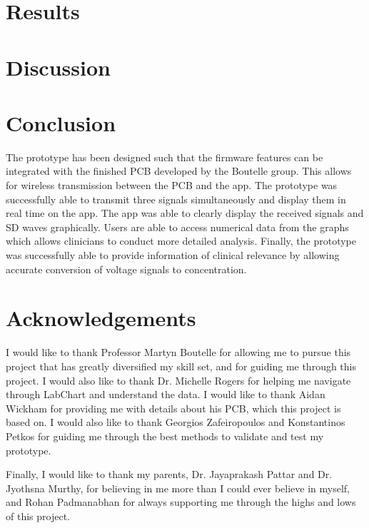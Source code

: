 \documentclass[12pt,twoside]{article}
\begin{document}
\section{Results}

\newpage

\section{Discussion}

\newpage

\section{Conclusion}
The prototype has been designed such that the firmware features can be integrated with the finished PCB developed by the Boutelle group. This allows for wireless transmission between the PCB and the app. The prototype was successfully able to transmit three signals simultaneously and display them in real time on the app. The app was able to clearly display the received signals and SD waves graphically. Users are able to access numerical data from the graphs which allows clinicians to conduct more detailed analysis. Finally, the prototype was successfully able to provide information of clinical relevance by allowing accurate conversion of voltage signals to concentration.

\newpage

\section{Acknowledgements}
I would like to thank Professor Martyn Boutelle for allowing me to pursue this project that has greatly diversified my skill set, and for guiding me through this project. I would also like to thank Dr. Michelle Rogers for helping me navigate through LabChart and understand the data. I would like to thank Aidan Wickham for providing me with details about his PCB, which this project is based on. I would also like to thank Georgios Zafeiropoulos and Konstantinos Petkos for guiding me through the best methods to validate and test my prototype. 

Finally, I would like to thank my parents, Dr. Jayaprakash Pattar and Dr. Jyothsna Murthy, for believing in me more than I could ever believe in myself, and Rohan Padmanabhan for always supporting me through the highs and lows of this project.

\newpage


\end{document}
